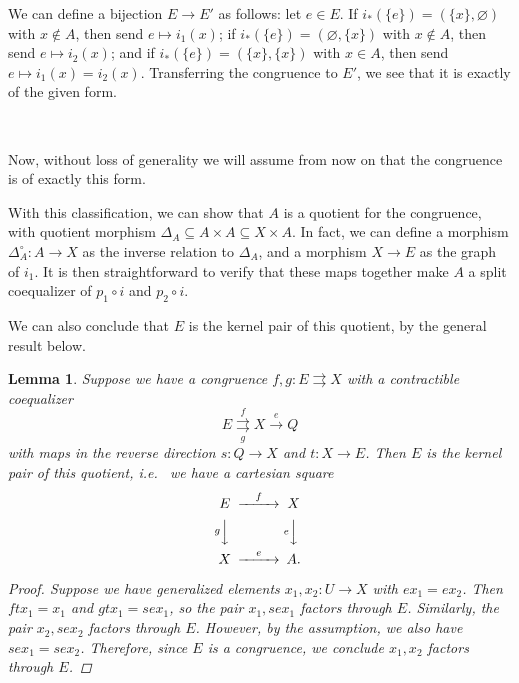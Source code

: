 \documentclass[a4paper,12pt,reqno]{amsart}
\newtheorem{lemma}{Lemma}
\begin{document}
We can define a bijection $E \to E'$ as follows: let $e \in E$.  If $i_*(\{ e \}) = (\{ x \}, \varnothing)$ with $x\notin A$, then send $e \mapsto i_1(x)$; if $i_*(\{ e \}) = (\varnothing, \{ x \})$ with $x\notin A$, then send $e \mapsto i_2(x)$; and if $i_*(\{ e \}) = (\{ x \}, \{ x \})$ with $x \in A$, then send $e \mapsto i_1(x) = i_2(x)$.  Transferring the congruence to $E'$, we see that it is exactly of the given form.

~

Now, without loss of generality we will assume from now on that the congruence is of exactly this form.

With this classification, we can show that $A$ is a quotient for the congruence, with quotient morphism $\Delta_A \subseteq A \times A \subseteq X \times A$.  In fact, we can define a morphism $\Delta_A^\circ : A \to X$ as the inverse relation to $\Delta_A$, and a morphism $X \to E$ as the graph of $i_1$.  It is then straightforward to verify that these maps together make $A$ a split coequalizer of $p_1 \circ i$ and $p_2 \circ i$.

We can also conclude that $E$ is the kernel pair of this quotient, by the general result below.

\begin{lemma}
	Suppose we have a congruence $f, g : E \rightrightarrows X$ with a contractible coequalizer
	$$ E \overset{f}{\underset{g}{\rightrightarrows}} X \overset{e}{\rightarrow} Q $$
	with maps in the reverse direction $s : Q \to X$ and $t : X \to E$.  Then $E$ is the kernel pair of this quotient, i.e.~ we have a cartesian square
    $$
    \begin{CD}
	    E @> f >> X \\
	    @V g VV @V e VV \\
	    X @> e >> A.
    \end{CD}
    $$
    \begin{proof}
    	Suppose we have generalized elements $x_1, x_2 : U \to X$ with $e x_1 = e x_2$.  Then $f t x_1 = x_1$ and $g t x_1 = s e x_1$, so the pair $x_1, s e x_1$ factors through $E$.  Similarly, the pair $x_2, s e x_2$ factors through $E$.  However, by the assumption, we also have $s e x_1 = s e x_2$.  Therefore, since $E$ is a congruence, we conclude $x_1, x_2$ factors through $E$.
    \end{proof}
\end{lemma}
\end{document}
